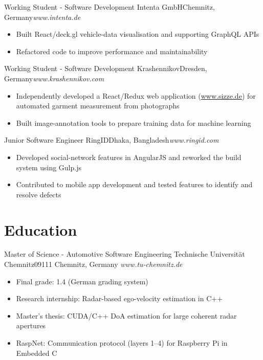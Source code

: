 \documentclass[11pt,a4paper,sans]{moderncv}
\begin{document}
{Working Student - Software Development}
{Intenta GmbH}{Chemnitz, Germany}{\textit{www.intenta.de}}
{\begin{itemize}
  \item Built React/deck.gl vehicle-data visualisation and supporting GraphQL APIs
  \item Refactored code to improve performance and maintainability
\end{itemize}}

{Working Student - Software Development}
{Krashennikov}{Dresden, Germany}{\textit{www.krashennikov.com}}
{\begin{itemize}
  \item Independently developed a React/Redux web application (\underline{www.sizze.de}) for automated garment measurement from photographs
  \item Built image-annotation tools to prepare training data for machine learning
\end{itemize}}

{Junior Software Engineer}
{RingID}{Dhaka, Bangladesh}{\textit{www.ringid.com}}
{\begin{itemize}
  \item Developed social-network features in AngularJS and reworked the build system using Gulp.js
  \item Contributed to mobile app development and tested features to identify and resolve defects
\end{itemize}}

\section{Education}
{Master of Science - Automotive Software Engineering}
{Technische Universität Chemnitz}{09111 Chemnitz, Germany}
{\textit{www.tu-chemnitz.de}}
{\begin{itemize}
  \item Final grade: 1.4 (German grading system)
  \item Research internship: Radar-based ego-velocity estimation in C++
  \item Master's thesis: CUDA/C++ DoA estimation for large coherent radar apertures
  \item RaspNet: Communication protocol (layers 1--4) for Raspberry Pi in Embedded C
\end{itemize}}
\end{document}
